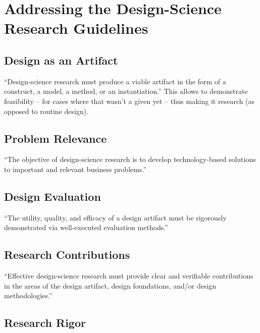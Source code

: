 \documentclass[a4paper,,tablecaptionabove]{scrbook}
\begin{document}
\hypertarget{addressing-the-design-science-research-guidelines}{%
\section{Addressing the Design-Science Research
Guidelines}\label{addressing-the-design-science-research-guidelines}}

\hypertarget{design-as-an-artifact}{%
\subsection{Design as an Artifact}\label{design-as-an-artifact}}

\enquote{Design-science research must produce a viable artifact in the
form of a construct, a model, a method, or an instantiation.} This
allows to demonstrate feasibility -- for cases where that wasn't a given
yet -- thus making it research (as opposed to routine design).

\hypertarget{problem-relevance}{%
\subsection{Problem Relevance}\label{problem-relevance}}

\enquote{The objective of design-science research is to develop
technology-based solutions to important and relevant business problems.}

\hypertarget{design-evaluation}{%
\subsection{Design Evaluation}\label{design-evaluation}}

\enquote{The utility, quality, and efficacy of a design artifact must be
rigorously demonstrated via well-executed evaluation methods.}

\hypertarget{research-contributions}{%
\subsection{Research Contributions}\label{research-contributions}}

\enquote{Effective design-science research must provide clear and
verifiable contributions in the areas of the design artifact, design
foundations, and/or design methodologies.}

\hypertarget{research-rigor}{%
\subsection{Research Rigor}\label{research-rigor}}
\end{document}
